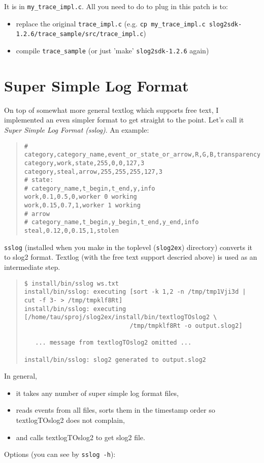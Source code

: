 \documentclass{article}
\begin{document}
It is in {\tt my\_trace\_impl.c}.  All you need to do to plug in this patch
is to:
\begin{itemize}
\item replace the original {\tt trace\_impl.c} 
(e.g. {\tt cp my\_trace\_impl.c slog2sdk-1.2.6/trace\_sample/src/trace\_impl.c})
\item compile {\tt trace\_sample} (or just 'make' {\tt slog2sdk-1.2.6} again)
\end{itemize}

\section{Super Simple Log Format}
On top of somewhat more general textlog which supports free text, 
I implemented an even simpler format to get straight to the point.
Let's call it {\it Super Simple Log Format (sslog)}.  An example:

\begin{quote}
\begin{verbatim}
# category,category_name,event_or_state_or_arrow,R,G,B,transparency,width
category,work,state,255,0,0,127,3
category,steal,arrow,255,255,255,127,3
# state:
# category_name,t_begin,t_end,y,info
work,0.1,0.5,0,worker 0 working
work,0.15,0.7,1,worker 1 working
# arrow
# category_name,t_begin,y_begin,t_end,y_end,info
steal,0.12,0,0.15,1,stolen
\end{verbatim}
\end{quote}

{\tt sslog} (installed when you make in the toplevel ({\tt slog2ex})
directory) converts it to slog2 format.  Textlog (with the free text
support descried above) is used as an intermediate step.

\begin{quote}
\begin{verbatim}
$ install/bin/sslog ws.txt
install/bin/sslog: executing [sort -k 1,2 -n /tmp/tmp1Vji3d | cut -f 3- > /tmp/tmpklf8Rt]
install/bin/sslog: executing [/home/tau/sproj/slog2ex/install/bin/textlogTOslog2 \
                             /tmp/tmpklf8Rt -o output.slog2]

   ... message from textlogTOslog2 omitted ...

install/bin/sslog: slog2 generated to output.slog2
\end{verbatim}
\end{quote}

In general,
\begin{itemize}
\item it takes any number of super simple log format files,
\item reads events from all files, sorts them in the timestamp order so textlogTOslog2 does not complain,
\item and calls textlogTOslog2 to get slog2 file.
\end{itemize}
Options (you can see by {\tt sslog -h}):
\end{document}
